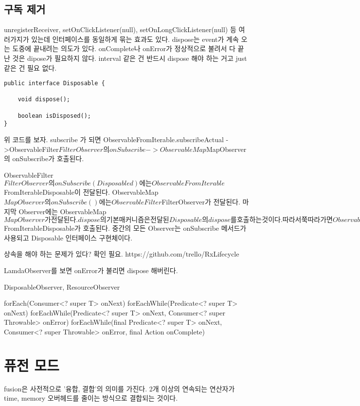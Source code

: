 \documentclass{book}
\begin{document}
\subsection{구독 제거}
unregisterReceiver, setOnClickListener(null), setOnLongClickListener(null) 등 여러가지가 있는데 인터페이스를 동일하게 묶는 효과도 있다.
dispose는 event가 계속 오는 도중에 끝내려는 의도가 있다. onComplete나 onError가 정상적으로 불려서 다 끝난 것은 dipose가 필요하지 않다.
interval 같은 건 반드시 dispose  해야 하는 거고 just 같은 건 필요 없다.


\begin{verbatim}
public interface Disposable {

    void dispose();

    boolean isDisposed();
}
\end{verbatim}

위 코드를 보자.
subscribe 가 되면 
ObservableFromIterable.subscribeActual
->ObservableFilter$FilterObserver의 onSubscribe
->ObservableMap$MapObserver의 onSubscribe가 호출된다.

ObservableFilter$FilterObserver의 onSubscribe(Disposable d)에는 
ObservableFromIterable$FromIterableDisposable이 전달된다.
ObservableMap$MapObserver의 onSubscribe()에는 ObservableFilter$FilterObserver가 전달된다.
마지막 Observer에는 ObservableMap$MapObserver가 전달된다.
dispose의 기본 매커니즘은 전달된 Disposable의 dispose를 호출하는 것이다.
따라서 쭉 따라가면 ObservableFromIterable$FromIterableDisposable가  호출된다.
중간의 모든 Observer는 onSubscribe 메서드가 사용되고 Disposable 인터페이스 구현체이다.

 


상속을 해야 하는 문제가 있다? 확인 필요.
https://github.com/trello/RxLifecycle

LamdaObserver를 보면 onError가 불리면 dispose 해버린다.

DisposableObserver, ResourceObserver

forEach(Consumer<? super T> onNext)
forEachWhile(Predicate<? super T> onNext)
forEachWhile(Predicate<? super T> onNext, Consumer<? super Throwable> onError)
forEachWhile(final Predicate<? super T> onNext, Consumer<? super Throwable> onError,
            final Action onComplete)

\section{퓨전 모드}
fusion은 사전적으로 '융합, 결합'의 의미를 가진다.
2개 이상의 연속되는 연산자가 time, memory 오버헤드를 줄이는 방식으로 결합되는 것이다.
\end{document}
